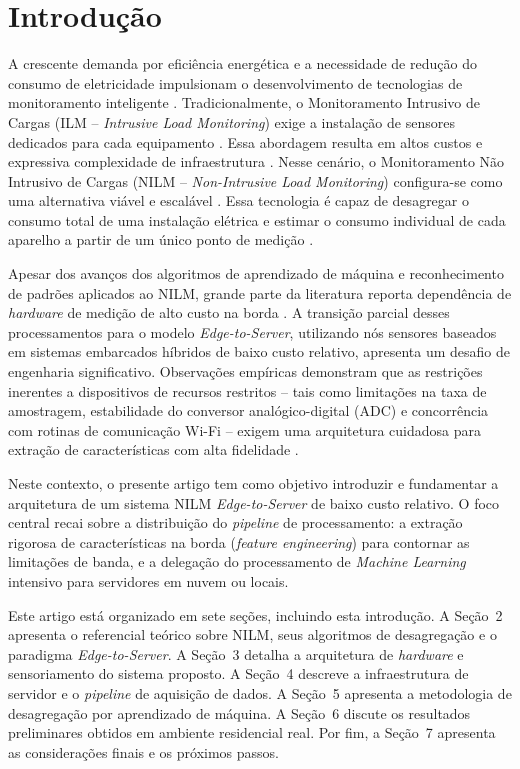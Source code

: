 \documentclass[12pt]{article}
\begin{document}
\section{Introdu\c{c}\~ao}

A crescente demanda por efici\^encia energ\'etica e a necessidade de redu\c{c}\~ao
do consumo de eletricidade impulsionam o desenvolvimento de tecnologias de
monitoramento inteligente \citep{ref2,ref6}. Tradicionalmente, o Monitoramento
Intrusivo de Cargas (ILM -- \textit{Intrusive Load Monitoring}) exige a
instala\c{c}\~ao de sensores dedicados para cada equipamento \citep{ref1,ref2}.
Essa abordagem resulta em altos custos e expressiva complexidade de
infraestrutura \citep{ref2,ref3}. Nesse cen\'ario, o Monitoramento N\~ao Intrusivo de
Cargas (NILM -- \textit{Non-Intrusive Load Monitoring}) configura-se como uma
alternativa vi\'avel e escal\'avel \citep{ref1,ref6}. Essa tecnologia \'e capaz de
desagregar o consumo total de uma instala\c{c}\~ao el\'etrica e estimar o consumo
individual de cada aparelho a partir de um \'unico ponto de medi\c{c}\~ao
\citep{ref1}.

Apesar dos avan\c{c}os dos algoritmos de aprendizado de m\'aquina e reconhecimento
de padr\~oes aplicados ao NILM, grande parte da literatura reporta depend\^encia
de \textit{hardware} de medi\c{c}\~ao de alto custo na borda \citep{ref6,ref7}. A
transi\c{c}\~ao parcial desses processamentos para o modelo
\textit{Edge-to-Server}, utilizando n\'os sensores baseados em sistemas embarcados
h\'ibridos de baixo custo relativo, apresenta um desafio de engenharia
significativo. Observa\c{c}\~oes emp\'iricas demonstram que as restri\c{c}\~oes
inerentes a dispositivos de recursos restritos -- tais como limita\c{c}\~oes na
taxa de amostragem, estabilidade do conversor anal\'ogico-digital (ADC) e
concorr\^encia com rotinas de comunica\c{c}\~ao Wi-Fi -- exigem uma arquitetura
cuidadosa para extra\c{c}\~ao de caracter\'isticas com alta fidelidade
\citep{ref8}.

Neste contexto, o presente artigo tem como objetivo introduzir e fundamentar a
arquitetura de um sistema NILM \textit{Edge-to-Server} de baixo custo relativo.
O foco central recai sobre a distribui\c{c}\~ao do \textit{pipeline} de
processamento: a extra\c{c}\~ao rigorosa de caracter\'isticas na borda
(\textit{feature engineering}) para contornar as limita\c{c}\~oes de banda, e a
delega\c{c}\~ao do processamento de \textit{Machine Learning} intensivo para
servidores em nuvem ou locais.

Este artigo est\'a organizado em sete se\c{c}\~oes, incluindo esta introdu\c{c}\~ao.
A Se\c{c}\~ao~2 apresenta o referencial te\'orico sobre NILM, seus algoritmos de
desagrega\c{c}\~ao e o paradigma \textit{Edge-to-Server}. A Se\c{c}\~ao~3 detalha
a arquitetura de \textit{hardware} e sensoriamento do sistema proposto. A
Se\c{c}\~ao~4 descreve a infraestrutura de servidor e o \textit{pipeline} de
aquisi\c{c}\~ao de dados. A Se\c{c}\~ao~5 apresenta a metodologia de
desagrega\c{c}\~ao por aprendizado de m\'aquina. A Se\c{c}\~ao~6 discute os
resultados preliminares obtidos em ambiente residencial real. Por fim, a
Se\c{c}\~ao~7 apresenta as considera\c{c}\~oes finais e os pr\'oximos passos.
\end{document}
